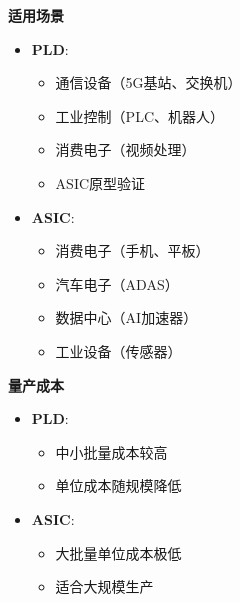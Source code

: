 \documentclass{beamer}
\providecommand{\tightlist}{%
  \setlength{\itemsep}{0pt}\setlength{\parskip}{0pt}}
\begin{document}
\begin{frame}{\textbf{适用场景}}

\begin{itemize}
\tightlist
\item
    \textbf{PLD}:

    \begin{itemize}
    \tightlist
    \item
    通信设备（5G基站、交换机）\\
    \item
    工业控制（PLC、机器人）\\
    \item
    消费电子（视频处理）\\
    \item
    ASIC原型验证\\
    \end{itemize}
\item
    \textbf{ASIC}:

    \begin{itemize}
    \tightlist
    \item
    消费电子（手机、平板）\\
    \item
    汽车电子（ADAS）\\
    \item
    数据中心（AI加速器）\\
    \item
    工业设备（传感器）
    \end{itemize}
\end{itemize}
\end{frame}

\begin{frame}{\textbf{量产成本}}

\begin{itemize}
\tightlist
\item
    \textbf{PLD}:

    \begin{itemize}
    \tightlist
    \item
    中小批量成本较高\\
    \item
    单位成本随规模降低\\
    \end{itemize}
\item
    \textbf{ASIC}:

    \begin{itemize}
    \tightlist
    \item
    大批量单位成本极低\\
    \item
    适合大规模生产
    \end{itemize}
\end{itemize}
\end{frame}
\end{document}
